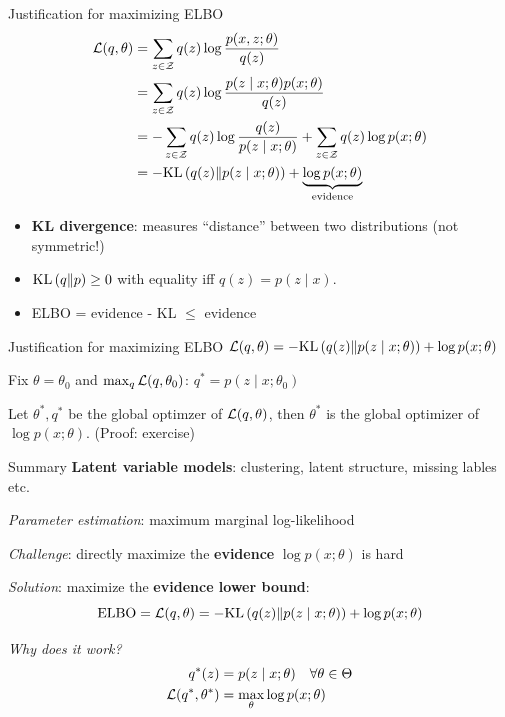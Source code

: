 \documentclass[usenames,dvipsnames,notes]{beamer}
\begin{document}
\begin{frame}
    {Justification for maximizing ELBO}
    \begin{align*}
        \mathcal{L}(q, \theta) &= \sum_{z\in\mathcal{Z}} q(z) \log \frac{p(x,z;\theta)}{q(z)} \\
        &= \sum_{z\in\mathcal{Z}} q(z)\log \frac{p(z\mid x;\theta)p(x;\theta)}{q(z)} \\
        &= -\sum_{z\in\mathcal{Z}}q(z) \log \frac{q(z)}{p(z\mid x;\theta)}
        + \sum_{z\in\mathcal{Z}} q(z) \log p(x;\theta) \\
        &= -\text{KL}\left( q(z) \| p(z\mid x;\theta) \right) + \underbrace{\log p(x;\theta)}_{\text{evidence}}
    \end{align*}
    \vspace{-2em}
    \begin{itemize}
        \item \textbf{KL divergence}: measures ``distance'' between two distributions (not symmetric!)
        \item $\text{KL}\left( q \| p \right)\ge 0$ with equality iff $q(z) = p(z\mid x)$.
        \item ELBO = evidence - KL $\le$ evidence
    \end{itemize}
\end{frame}

\begin{frame}
    {Justification for maximizing ELBO}
    $
    \mathcal{L}(q, \theta) = -\text{KL}\left( q(z) \| p(z\mid x;\theta) \right) + \log p(x;\theta)
    $

    Fix $\theta=\theta_0$ and $\max_q \mathcal{L}(q, \theta_0)$: $q^* = p(z\mid x;\theta_0)$ 
    \vspace{10em}

    Let $\theta^*, q^*$ be the global optimzer of $\mathcal{L}(q, \theta)$, then $\theta^*$ is the global optimizer of $\log p(x;\theta)$. (Proof: exercise)
\end{frame}

\begin{frame}
    {Summary}
    \textbf{Latent variable models}: clustering, latent structure, missing lables etc.

    \emph{Parameter estimation}: maximum marginal log-likelihood

    \emph{Challenge}: directly maximize the \textbf{evidence} $\log p(x;\theta)$ is hard

    \emph{Solution}: maximize the \textbf{evidence lower bound}:
    $$
    \text{ELBO} = \mathcal{L}(q, \theta) = -\text{KL}\left( q(z) \| p(z\mid x;\theta) \right) + \log p(x;\theta)
    $$

    \emph{Why does it work?}
    \begin{align*}
        q^*(z) &= p(z\mid x; \theta) \quad \forall \theta \in \Theta \\
        \mathcal{L}(q^*, \theta^*) &= \max_\theta \log p(x; \theta)
    \end{align*}
\end{frame}
\end{document}
